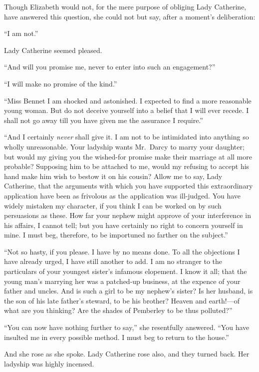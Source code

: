Though Elizabeth would not, for the mere purpose of obliging
Lady Catherine, have answered this question, she could not but
say, after a moment's deliberation:

``I am not.''

Lady Catherine seemed pleased.

``And will you promise me, never to enter into such an engagement?''

``I will make no promise of the kind.''

``Miss Bennet I am shocked and astonished.  I expected to find a
more reasonable young woman.  But do not deceive yourself into
a belief that I will ever recede.  I shall not go away till you
have given me the assurance I require.''

``And I certainly \emph{never} shall give it.  I am not to be intimidated
into anything so wholly unreasonable.  Your ladyship wants
Mr.\ Darcy to marry your daughter; but would my giving you the
wished-for promise make their marriage at all more probable?
Supposing him to be attached to me, would my refusing to accept
his hand make him wish to bestow it on his cousin?  Allow me to
say, Lady Catherine, that the arguments with which you have
supported this extraordinary application have been as frivolous
as the application was ill-judged.  You have widely mistaken my
character, if you think I can be worked on by such persuasions
as these.  How far your nephew might approve of your interference
in his affairs, I cannot tell; but you have certainly no right
to concern yourself in mine.  I must beg, therefore, to be
importuned no farther on the subject.''

``Not so hasty, if you please.  I have by no means done.
To all the objections I have already urged, I have still
another to add.  I am no stranger to the particulars of your
youngest sister's infamous elopement.  I know it all; that
the young man's marrying her was a patched-up business, at the
expence of your father and uncles.  And is such a girl to be
my nephew's sister?  Is her husband, is the son of his late
father's steward, to be his brother?  Heaven and earth!---of
what are you thinking?  Are the shades of Pemberley to be
thus polluted?''

``You can now have nothing further to say,'' she resentfully
answered.  ``You have insulted me in every possible method.
I must beg to return to the house.''

And she rose as she spoke.  Lady Catherine rose also, and they
turned back.  Her ladyship was highly incensed.

